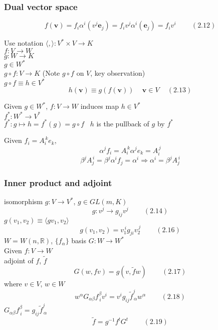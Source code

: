\documentclass[twoside]{amsart}
\newcommand{\exercisehead}[1]
  {\smallskip
   \noindent{\large\bf Exercise #1.}
   }
\begin{document}
\subsubsection{Dual vector space}

\[
f(\mathbf{v}) = f_i \alpha^i(v^j \mathbf{e}_j ) = f_i v^j \alpha^i(\mathbf{e}_j) = f_i v^i \quad \quad \, (2.12)
\]

Use notation $\langle, \rangle : V^* \times V \to K$ \\

$f: V \to W$ \\
$g: W \to K$ \\
$g\in W^*$ \\
$g\circ f : V \to K$ (Note $g\circ f$ on $V$, key observation) \\
$g\circ f \equiv h \in V^*$ 
\[
h(\mathbf{v}) \equiv g(f(\mathbf{v})) \quad \, \mathbf{v} \in V \quad \, (2.13)
\]

Given $g \in W^*$, $f:V \to W$ induces map $h\in V^*$ \\
$f^*: W^* \to V^*$ \\
$f^*:g \mapsto h = f^*(g) = g\circ f$ \quad \, $h$ is the pullback of $g$ by $f^*$


\exercisehead{2.9} 

Given $f_i = A_i^{\, k} e_k$, 
\[
\alpha^j f_i = A_i^{\, k} \alpha^j e_k = A_i^{\, j}
\]
\[
\beta^j A_j^{ \, i} = \beta^j \alpha^i f_j = \alpha^i \Longrightarrow \alpha^i = \beta^j A_j^{\, i }
\]

\subsubsection{Inner product and adjoint}

isomorphism $g:V \to V^*$, $g\in GL(m,K)$ 
\[
g:v^j \to g_{ij} v^j \quad \quad \, (2.14)
\]
$g(v_1, v_2) \equiv \langle gv_1, v_2 \rangle$ 
\[
g(v_1, v_2) = v_1^{\, i} g_{ji} v_2^{\, j} \quad \quad \, (2.16)
\]
$W = W(n,\mathbb{R})$, $\lbrace f_{\alpha} \rbrace$ basis $G:W \to W^*$ \\

Given $f:V \to W$ \\
adjoint of $f$, $\widetilde{f}$ 
\[
G(w,fv) = g(v,\widetilde{f}w) \quad \quad \, (2.17)
\]
where $v\in V$, $w\in W$ 
\[
w^{\alpha} G_{\alpha \beta} f^{\beta}_{\, i} v^i = v^i g_{ij} \widetilde{f}^j_{\, \alpha} w^{\alpha} \quad \quad \, (2.18)
\]
$G_{\alpha \beta} f^{\beta}_{\, i} = g_{ij} \widetilde{f}^j_{\, \alpha} $
\[
\widetilde{f} = g^{-1} f^t G^t \quad \quad \, (2.19)
\]
\end{document}
